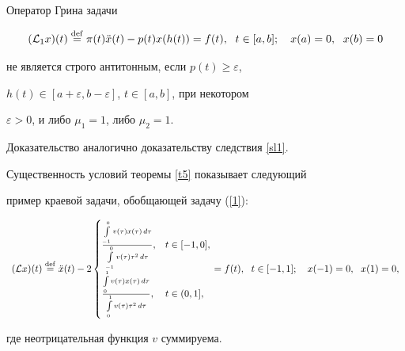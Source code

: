 \begin{cors}


Оператор Грина задачи


$$


(\L_1x)(t)\df


\pi(t)\Ddot x(t)-p(t)x(h(t))=f(t),\ \; t\in[a,b];\quad


x(a)=0,\ \; x(b)=0


$$


не является строго антитонным, если $p(t)\ge\varepsilon$,


$h(t)\in[a+\varepsilon,b-\varepsilon]$, $t\in[a,b]$, при некотором


$\varepsilon>0$, и либо $\mu_1=1$, либо $\mu_2=1$.


\end{cors}





Доказательство аналогично доказательству следствия \ref{sl1}.








Существенность условий теоремы \ref{t5} показывает следующий


пример краевой задачи, обобщающей задачу (\ref{1}):


\begin{equation}\label{n1}


\begin{array}{c}


(\L x)(t)\df\Ddot x(t)-2


\begin{cases}


\frac{\int\limits_{-1}^0v(\tau)x(\tau)\,d\tau}


{\int\limits_{-1}^0v(\tau)\tau^2\,d\tau}, & t\in[-1,0],\\


\frac{\int\limits_{0}^1v(\tau)x(\tau)\,d\tau}


{\int\limits_{0}^1v(\tau)\tau^2\,d\tau}, & t\in(0,1],


\end{cases}


=f(t),\ \; t\in[-1,1];\quad


x(-1)=0,\ \; x(1)=0,


\end{array}


\end{equation}


где неотрицательная функция $v$ суммируема.



